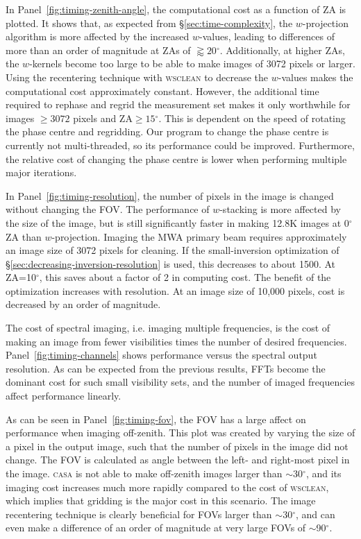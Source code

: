 \documentclass[useAMS,usenatbib]{mn2e}
\newcommand{\degree}{\ensuremath{^{\circ}}\xspace}
\begin{document}
In Panel~\ref{fig:timing-zenith-angle}, the computational cost as a function of ZA is plotted. It shows that, as expected from \S\ref{sec:time-complexity}, the $w$-projection algorithm is more affected by the increased $w$-values, leading to differences of more than an order of magnitude at ZAs of $\gtrapprox 20$\degree. Additionally, at higher ZAs, the $w$-kernels become too large to be able to make images of 3072 pixels or larger. Using the recentering technique with \textsc{wsclean} to decrease the $w$-values makes the computational cost approximately constant. However, the additional time required to rephase and regrid the measurement set makes it only worthwhile for images $\ge3072$ pixels and $\textrm{ZA}\ge15\degree$. This is dependent on the speed of rotating the phase centre and regridding. Our program to change the phase centre is currently not multi-threaded, so its performance could be improved. Furthermore, the relative cost of changing the phase centre is lower when performing multiple major iterations.

In Panel~\ref{fig:timing-resolution}, the number of pixels in the image is changed without changing the FOV. The performance of $w$-stacking is more affected by the size of the image, but is still significantly faster in making 12.8K images at 0\degree ZA than $w$-projection. Imaging the MWA primary beam requires approximately an image size of 3072 pixels for cleaning. If the small-inversion optimization of \S\ref{sec:decreasing-inversion-resolution} is used, this decreases to about 1500. At ZA=10\degree, this saves about a factor of 2 in computing cost. The benefit of the optimization increases with resolution. At an image size of 10,000 pixels, cost is decreased by an order of magnitude.

The cost of spectral imaging, i.e. imaging multiple frequencies, is the cost of making an image from fewer visibilities times the number of desired frequencies. Panel~\ref{fig:timing-channels} shows performance versus the spectral output resolution. As can be expected from the previous results, FFTs become the dominant cost for such small visibility sets, and the number of imaged frequencies affect performance linearly.

As can be seen in Panel~\ref{fig:timing-fov}, the FOV has a large affect on performance when imaging off-zenith. This plot was created by varying the size of a pixel in the output image, such that the number of pixels in the image did not change. The FOV is calculated as angle between the left- and right-most pixel in the image. \textsc{casa} is not able to make off-zenith images larger than $\sim$30\degree, and its imaging cost increases much more rapidly compared to the cost of \textsc{wsclean}, which implies that gridding is the major cost in this scenario. The image recentering technique is clearly beneficial for FOVs larger than $\sim$30\degree, and can even make a difference of an order of magnitude at very large FOVs of $\sim$90\degree.
\end{document}
